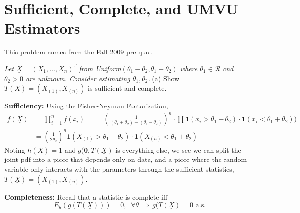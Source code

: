 \documentclass[12pt]{report}
\begin{document}
\chapter*{Sufficient, Complete, and UMVU Estimators}
This problem comes from the Fall 2009 pre-qual. 

\emph{
Let $\underline{X} = (X_1, \dots, X_n)^T$ from Uniform$(\theta_1-\theta_2, \theta_1+\theta_2)$ where $\theta_1 \in \mathcal{R}$ and $\theta_2 > 0$ are unknown. Consider estimating $\theta_1, \theta_2$. }
\newline
(a) Show $T(\underline{X}) = (X_{(1)}, X_{(n)})$ is sufficient and complete.

\textbf{Sufficiency:} Using the Fisher-Neyman Factorization,
\begin{align*}
f(\underline{X}) &= \prod_{i=1}^n f(x_i) = 
 = \left( \frac{1}{(\theta_1+\theta_2) - (\theta_1-\theta_2)} \right)^n
\cdot \prod \mathbf{1}(x_i > \theta_1-\theta_2) \cdot \mathbf{1}( x_i < \theta_1+\theta_2) ) \\
&= \left( \frac{1}{2 \theta_2} \right)^n \mathbf{1}( { X_{(1)} > \theta_1-\theta_2}) \cdot \mathbf{1}( X_{(n)} < \theta_1 + \theta_2)
\end{align*}
Noting $h(X) = 1$ and $g(\mathbf{\theta}, T(\underline{X})$ is everything else, we see we can split the joint pdf into a piece that depends only on data, and a piece where the random variable only interacts with the parameters through the sufficient statistics, $T(\underline{X}) = (X_{(1)}, X_{(n)})$. 

\textbf{Completeness:} Recall that a statistic is complete iff 
\[ E_\theta(g(T(\underline{X}))) = 0, \;\; \forall \theta\ \Rightarrow\  g(T(\underline{X}) = 0 \text{ a.s.} \]
\end{document}
